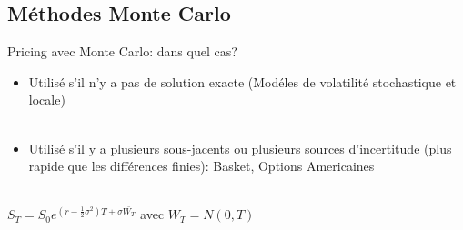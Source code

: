 \documentclass[10pt]{beamer}
\begin{document}
\subsection{Méthodes Monte Carlo}

\begin{frame}{Pricing avec Monte Carlo: dans quel cas?}{}
  \begin{itemize}
    \item Utilisé s'il n'y a pas de solution exacte (Modéles de volatilité stochastique et locale) \\~\\
    
    \item Utilisé s'il y a plusieurs sous-jacents ou plusieurs sources d'incertitude (plus rapide que les différences finies): Basket, Options Americaines \\~\\
    
  \end{itemize}
  
  \centering
  $S_T = S_0  e ^ {(r - \frac{1}{2}\sigma ^{2})T + \sigma \bar{W_T}} $ avec $W_T = N(0,T)$ \\~\\ 
  
  \begin{figure}[t]
\centering



\end{figure}


\end{frame}
\end{document}
